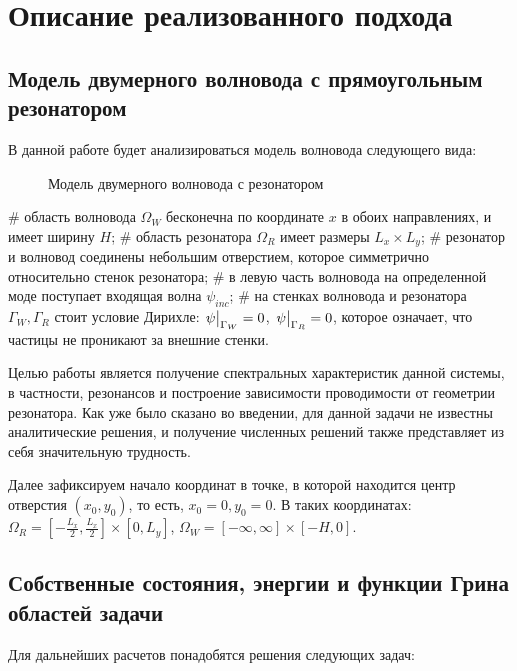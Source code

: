 \chapter{Описание реализованного подхода}
\label{chapter2}

\section{Модель двумерного волновода с прямоугольным резонатором}
В данной работе будет анализироваться модель волновода следующего вида:
\begin{figure}[h!]
\begin{tikzpicture}[scale=0.7]

\end{tikzpicture}
\caption{Модель двумерного волновода с резонатором}
\end{figure}

\begin{ilist}
# область волновода $\Omega_W$ бесконечна по координате $x$ в обоих направлениях, и имеет ширину $H$;
# область резонатора $\Omega_R$ имеет размеры $L_x \times L_y$;
# резонатор и волновод соединены небольшим отверстием, которое симметрично относительно стенок резонатора;
# в левую часть волновода на определенной моде поступает входящая волна $\psi_{inc}$;
# на стенках волновода и резонатора $\Gamma_W, \Gamma_R$ стоит условие Дирихле: $\eval{\psi}_{\Gamma_W} = 0$, $\eval{\psi}_{\Gamma_R} = 0$, которое означает, что частицы не проникают за внешние стенки.
\end{ilist}

Целью работы является получение спектральных характеристик данной системы, в частности, резонансов и построение зависимости проводимости от геометрии резонатора. Как уже было сказано во введении, для данной задачи не известны аналитические решения, и получение численных решений также представляет из себя значительную трудность.

Далее зафиксируем начало координат в точке, в которой находится центр отверстия $(x_0, y_0)$, то есть, $x_0 = 0, y_0 = 0$. В таких координатах: $\Omega_R = [- \frac{L_x}{2}, \frac{L_x}{2}] \times [0, L_y]$, $\Omega_W = [-\infty, \infty] \times [-H, 0]$.

\section{Собственные состояния, энергии и функции Грина областей задачи}
Для дальнейших расчетов понадобятся решения следующих задач:

